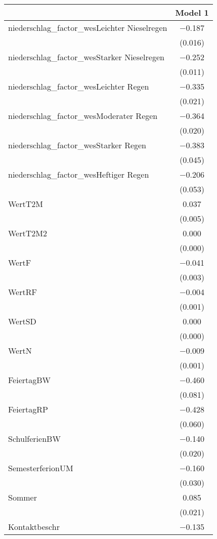 \begin{table}
\centering
\begin{tabular}[t]{lc}
\toprule
  & Model 1\\
\midrule
niederschlag\_factor\_wesLeichter Nieselregen & \num{-0.187}\\
 & (\num{0.016})\\
niederschlag\_factor\_wesStarker Nieselregen & \num{-0.252}\\
 & (\num{0.011})\\
niederschlag\_factor\_wesLeichter Regen & \num{-0.335}\\
 & \vphantom{1} (\num{0.021})\\
niederschlag\_factor\_wesModerater Regen & \num{-0.364}\\
 & \vphantom{1} (\num{0.020})\\
niederschlag\_factor\_wesStarker Regen & \num{-0.383}\\
 & (\num{0.045})\\
niederschlag\_factor\_wesHeftiger Regen & \num{-0.206}\\
 & (\num{0.053})\\
WertT2M & \num{0.037}\\
 & (\num{0.005})\\
WertT2M2 & \num{0.000}\\
 & \vphantom{1} (\num{0.000})\\
WertF & \num{-0.041}\\
 & (\num{0.003})\\
WertRF & \num{-0.004}\\
 & \vphantom{1} (\num{0.001})\\
WertSD & \num{0.000}\\
 & (\num{0.000})\\
WertN & \num{-0.009}\\
 & (\num{0.001})\\
FeiertagBW & \num{-0.460}\\
 & (\num{0.081})\\
FeiertagRP & \num{-0.428}\\
 & (\num{0.060})\\
SchulferienBW & \num{-0.140}\\
 & (\num{0.020})\\
SemesterferionUM & \num{-0.160}\\
 & (\num{0.030})\\
Sommer & \num{0.085}\\
 & (\num{0.021})\\
Kontaktbeschr & \num{-0.135}\\

\end{tabular}
\end{table}
